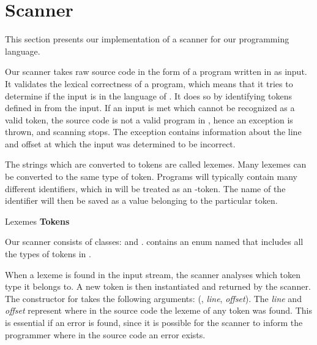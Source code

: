 \section{Scanner}
\label{sec:scannerimplementation}
This section presents our implementation of a scanner for our programming language.

Our scanner takes raw source code in the form of a program written in
\productname{} as input. It validates the lexical correctness of a
\productname{} program, which means that it tries to determine if the
input is in the language of \productname{}. It does so by identifying
tokens defined in \productname{} from the input. If an input is met
which cannot be recognized as a valid token, the source code is not
a valid program in \productname{}, hence an exception is thrown, and
scanning stops. The exception contains information about the line and
offset at which the input was determined to be incorrect.

The strings which are converted to tokens are called lexemes. Many
lexemes can be converted to the same type of token. Programs will
typically contain many different identifiers, which in \productname{}
will be treated as an -token. The name of the identifier will
then be saved as a value belonging to the particular token.

                 {						}
       {Lexemes	}{\textbf{Tokens}		}{
\tabrow{$[$    	}{ LBRACKET				}
\tabrow{$]$		}{ RBRACKET 			}
}

Our scanner consists of classes:  and
.  contains an enum named
 that includes all the types of tokens in \productname{}.

When a lexeme is found in the input stream, the scanner analyses which
token type it belongs to. A new token is then instantiated and returned
by the scanner. The constructor for  takes the following
arguments: (, \textit{line}, \textit{offset}). The
\textit{line} and \textit{offset} represent where in the source code the
lexeme of any token was found. This is essential if an error is found,
since it is possible for the scanner to inform the programmer where in
the source code an error exists.

